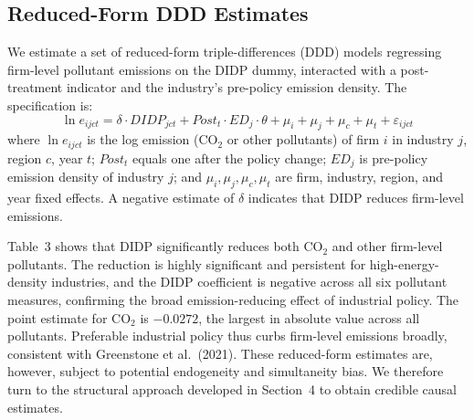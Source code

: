 \documentclass[11pt,a4paper]{article}
\begin{document}
\subsection{Reduced-Form DDD Estimates}

We estimate a set of reduced-form triple-differences (DDD) models regressing firm-level pollutant emissions on the DIDP dummy, interacted with a post-treatment indicator and the industry's pre-policy emission density. The specification is:
\begin{equation}
\ln e_{ijct} = \delta\cdot DIDP_{jct} + Post_t\cdot ED_j\cdot\theta + \mu_i + \mu_j + \mu_c + \mu_t + \varepsilon_{ijct}
\end{equation}
where $\ln e_{ijct}$ is the log emission (CO$_2$ or other pollutants) of firm $i$ in industry $j$, region $c$, year $t$; $Post_t$ equals one after the policy change; $ED_j$ is pre-policy emission density of industry $j$; and $\mu_i, \mu_j, \mu_c, \mu_t$ are firm, industry, region, and year fixed effects. A negative estimate of $\delta$ indicates that DIDP reduces firm-level emissions.


Table~3 shows that DIDP significantly reduces both CO$_2$ and other firm-level pollutants. The reduction is highly significant and persistent for high-energy-density industries, and the DIDP coefficient is negative across all six pollutant measures, confirming the broad emission-reducing effect of industrial policy. The point estimate for CO$_2$ is $-0.0272$, the largest in absolute value across all pollutants. Preferable industrial policy thus curbs firm-level emissions broadly, consistent with Greenstone et al.\ (2021). These reduced-form estimates are, however, subject to potential endogeneity and simultaneity bias. We therefore turn to the structural approach developed in Section~4 to obtain credible causal estimates.
\end{document}
